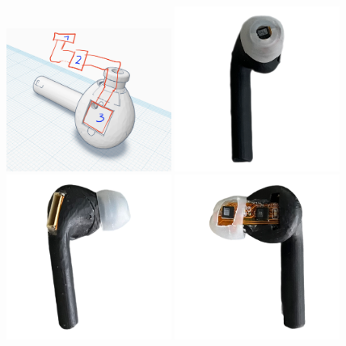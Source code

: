 \begin{figure}[!h]
    \centering
    \includegraphics[width=0.48\textwidth]{thesis-doc/images/prototype/flex_pcb_design_finding.png}
    \includegraphics[width=0.48\textwidth]{thesis-doc/images/prototype/Earpod_Front.png}
    \includegraphics[width=0.48\textwidth]{thesis-doc/images/prototype/Earpod_Side1.png}
    \includegraphics[width=0.48\textwidth]{thesis-doc/images/prototype/Earpod_Side2.png}

\end{figure}
